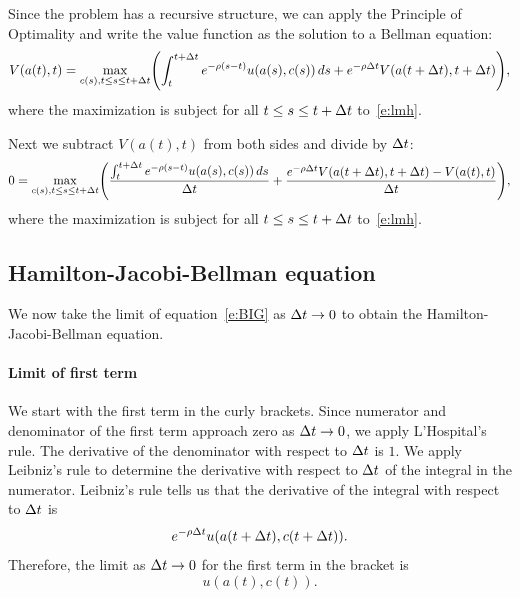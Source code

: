 \documentclass[letterpaper, 11pt, leqno]{article}
\begin{document}
Since the problem has a recursive structure, we can apply the Principle of Optimality and write the value function as the solution to a Bellman equation:
\begin{align*}
V(a(t),t) =\max[c(s), t\le s\le t+\D t]{\int_{t}^{t+\D t}e^{-\r (s-t)} u(a(s),c(s))\,ds + e^{-\r \D t} V(a(t+\D t),t+\D t)},
\end{align*}
where the maximization is subject for all $t\le s\le t+\Delta t$ to~\eqref{e:lmh}.

Next we subtract $V(a(t),t)$ from both sides and divide by $\Delta t$:
\begin{equation}
0 = \max[c(s), t\le s\le t+\D t]{\frac{\int_{t}^{t+\D t}e^{-\r (s-t)} u(a(s),c(s))\,ds}{\D t}+ \frac{e^{-\r \D t} V(a(t+\D t),t+\D t) - V(a(t),t)}{\D t}},
\label{e:BIG}\end{equation}
where the maximization is subject for all $t\le s\le t+\Delta t$ to~\eqref{e:lmh}.

\subsection{Hamilton-Jacobi-Bellman equation}

We now take the limit of equation~\eqref{e:BIG} as $\Delta t\to 0$ to obtain the Hamilton-Jacobi-Bellman equation.

\paragraph{Limit of first term} We start with the first term in the curly brackets. Since numerator and denominator of the first term approach zero as $\Delta t\to 0$, we apply L'Hospital's rule. The derivative of the denominator with respect to $\Delta t$ is $1$. We apply Leibniz's rule to determine the derivative with respect to $\Delta t$ of the integral in the numerator. Leibniz's rule tells us that the derivative of the integral with respect to $\Delta t$ is
\begin{equation*}
e^{-\rho \Delta t}  u(a(t+\Delta t),c(t+\Delta t)).
\end{equation*}
Therefore, the limit as $\Delta t\to 0$ for the first term in the bracket is 
\begin{equation}
u(a(t),c(t)).\label{e:BIG1}
\end{equation}
\end{document}
